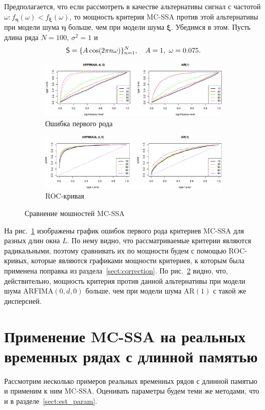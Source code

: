 \documentclass[specialist,
substylefile = spbu_report.rtx,
subf,href,colorlinks=true, 12pt]{disser}
\theoremstyle{definition}
\begin{document}
Предполагается, что если рассмотреть в качестве альтернативы сигнал с частотой $\omega:f_{\bm\eta}(\omega) < f_{\bm\xi}(\omega)$, то мощность критерия MC-SSA против этой альтернативы при модели шума $\bm\eta$ больше, чем при модели шума $\bm\xi$. Убедимся в этом. Пусть длина ряда $N=100$, $\sigma^2=1$ и
\[
	\mathsf{S} = \{A\cos(2 \pi n \omega)\}_{n=1}^N,\quad A=1,\ \omega=0.075.
\]

\begin{figure}[h]
	\begin{subfigure}{\textwidth}
		\includegraphics[width=\textwidth]{img/alphaI_comp.pdf}
		\caption{Ошибка первого рода}
		\label{fig:ar1_vs_fi_alphaI}
	\end{subfigure}
	\begin{subfigure}{\textwidth}
		\includegraphics[width=\textwidth]{img/roc_comp.pdf}
		\caption{ROC-кривая}
		\label{fig:ar1_vs_fi_roc}
	\end{subfigure}
	\caption{Сравнение мошностей MC-SSA}
	\label{fig:ar1_vs_fi}
\end{figure}
На рис.~\ref{fig:ar1_vs_fi_alphaI} изображены график ошибок первого рода критериев MC-SSA для разных длин окна $L$. По нему видно, что рассматриваемые критерии являются радикальными, поэтому сравнивать их по мощности будем с помощью ROC-кривых, которые являются графиками мощности критериев, к которым была применена поправка из раздела~\ref{sect:correction}. По рис.~\ref{fig:ar1_vs_fi_roc} видно, что, действительно, мощность критерия против данной альтернативы при модели шума $\mathrm{ARFIMA}(0, d, 0)$ больше, чем при модели шума $\mathrm{AR}(1)$ с такой же дисперсией.

\section{Применение MC-SSA на реальных временных рядах с длинной памятью}
Рассмотрим несколько примеров реальных временных рядов с длинной памятью и применим к ним MC-SSA. Оценивать параметры будем теми же методами, что и в разделе~\ref{sect:est_param}.
\end{document}
